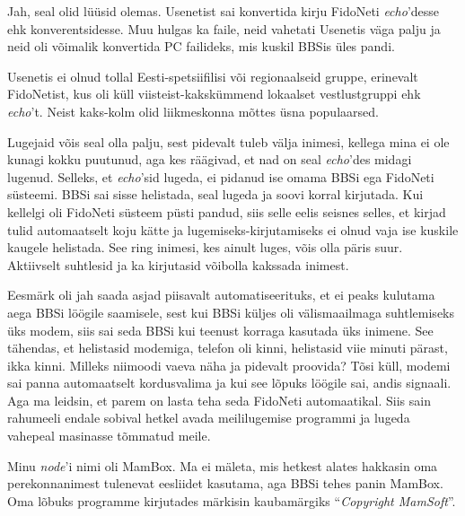 
Jah, seal olid lüüsid olemas. Usenetist sai konvertida kirju FidoNeti 
\emph{echo}'desse ehk konverentsidesse. Muu hulgas ka faile, neid vahetati
Usenetis väga palju ja neid oli võimalik konvertida 
PC failideks, mis kuskil BBSis üles pandi.


Usenetis ei olnud tollal Eesti-spetsiifilisi või 
regionaalseid gruppe, erinevalt FidoNetist, kus oli küll viisteist-kakskümmend lokaalset vestlustgruppi ehk \emph{echo}'t. 
Neist kaks-kolm olid liikmeskonna mõttes üsna populaarsed.


Lugejaid võis seal olla palju, sest pidevalt tuleb välja 
inimesi, kellega mina ei ole kunagi kokku puutunud, 
aga kes räägivad, et nad on seal \emph{echo}'des midagi lugenud. Selleks, et \emph{echo}'sid lugeda, ei pidanud ise
omama BBSi ega FidoNeti süsteemi. BBSi sai sisse helistada, seal lugeda ja soovi korral kirjutada. Kui kellelgi oli FidoNeti süsteem 
püsti pandud, siis selle eelis seisnes selles, et kirjad tulid 
automaatselt koju kätte ja lugemiseks-kirjutamiseks ei olnud vaja ise kuskile 
kaugele helistada. See ring inimesi, kes ainult luges, 
võis olla päris suur. Aktiivselt suhtlesid ja ka kirjutasid 
võibolla kakssada inimest.


Eesmärk oli jah saada asjad piisavalt automatiseerituks, et 
ei peaks kulutama aega 
BBSi löögile saamisele, sest kui BBSi küljes oli 
välismaailmaga suhtlemiseks üks modem, siis sai 
seda BBSi kui teenust korraga kasutada üks inimene. 
See tähendas, et helistasid modemiga, telefon oli kinni, helistasid viie minuti 
pärast, ikka kinni. Milleks niimoodi vaeva näha ja pidevalt 
proovida? Tõsi küll, modemi sai panna automaatselt kordusvalima 
ja kui see lõpuks löögile sai, andis signaali. Aga ma leidsin, et parem on lasta teha
seda FidoNeti automaatikal. Siis sain rahumeeli endale sobival hetkel avada meililugemise programmi ja lugeda vahepeal masinasse tõmmatud meile. 


Minu \emph{node}'i nimi oli MamBox. Ma ei mäleta, mis hetkest alates hakkasin oma perekonnanimest tulenevat eesliidet kasutama, aga BBSi tehes panin MamBox. 
Oma lõbuks programme kirjutades märkisin kaubamärgiks
\enquote{\emph{Copyright MamSoft}}.

